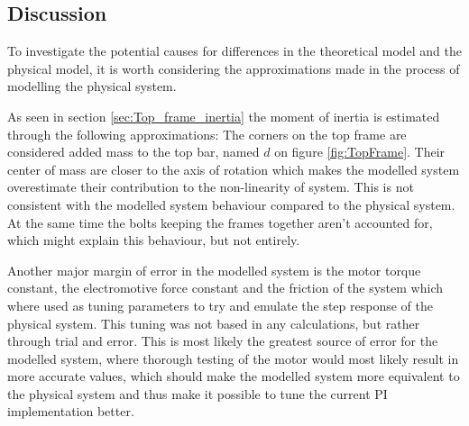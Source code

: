 \documentclass[../../Main]{subfiles}
\begin{document}
\subsection{Discussion}
\label{sec:discussion}


To investigate the potential causes for differences in  the theoretical model and the physical model, it is worth considering the approximations made in the process of modelling the physical system.

As seen in section \ref{sec:Top_frame_inertia} the moment of inertia is estimated through the following approximations: The corners on the top frame are considered added mass to the top bar, named $d$ on figure \ref{fig:TopFrame}. Their center of mass are closer to the axis of rotation which makes the modelled system overestimate their contribution to the non-linearity of system. This is not consistent with the modelled system behaviour compared to the physical system.
At the same time the bolts keeping the frames together aren't accounted for, which might explain this behaviour, but not entirely.


Another major margin of error in the modelled system is the motor torque constant, the electromotive force constant and the friction of the system which where used as tuning parameters to try and emulate the step response of the physical system. This tuning was not based in any calculations, but rather through trial and error. This is most likely the greatest source of error for the modelled system, where thorough testing of the motor would most likely result in more accurate values, which should make the modelled system more equivalent to the physical system and thus make it possible to tune the current PI implementation better.
\end{document}
